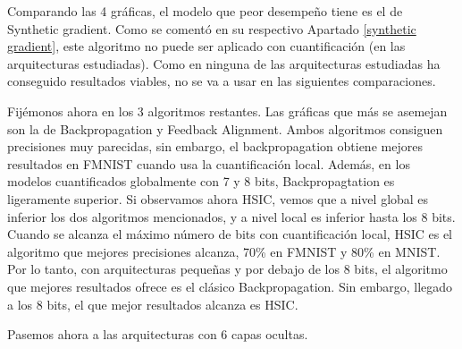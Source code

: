 Comparando las 4 gráficas, el modelo que peor desempeño tiene es el de Synthetic gradient. Como se comentó en su respectivo Apartado \ref{synthetic gradient}, este algoritmo no puede ser aplicado con cuantificación (en las arquitecturas estudiadas). Como en ninguna de las arquitecturas estudiadas ha conseguido resultados viables, no se va a usar en las siguientes comparaciones.  

Fijémonos ahora en los 3 algoritmos restantes. Las gráficas que más se asemejan son la de Backpropagation y Feedback Alignment. Ambos algoritmos consiguen precisiones muy parecidas, sin embargo, el backpropagation obtiene mejores resultados en FMNIST cuando usa la cuantificación local. Además, en los modelos cuantificados globalmente con 7 y 8 bits, Backpropagtation es ligeramente superior. Si observamos ahora HSIC, vemos que a nivel global es inferior los dos algoritmos mencionados, y a nivel local es inferior hasta los 8 bits. Cuando se alcanza el máximo número de bits con cuantificación local, HSIC es el algoritmo que mejores precisiones alcanza, 70\% en FMNIST y 80\% en MNIST. Por lo tanto, con arquitecturas pequeñas y por debajo de los 8 bits, el algoritmo que mejores resultados ofrece es el clásico Backpropagation. Sin embargo, llegado a los 8 bits, el que mejor resultados alcanza es HSIC.

Pasemos ahora a las arquitecturas con 6 capas ocultas. 

